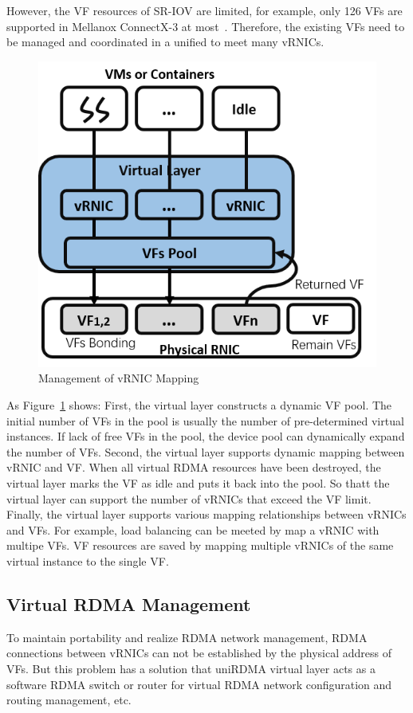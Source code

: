 However, the VF resources of SR-IOV are limited, for example, only 126 VFs are supported in Mellanox ConnectX-3 at most~\cite{ofed-manual}. Therefore, the existing VFs need to be managed and coordinated in a unified to meet many vRNICs.

\begin{figure}[!ht]
	\centering
	\includegraphics[width=1.0\linewidth]{images/vf-mapping}
	\caption{Management of vRNIC Mapping}
	\label{fig:vf-mapping}
\end{figure}

As Figure~\ref{fig:vf-mapping} shows: First, the virtual layer constructs a dynamic VF pool. The initial number of VFs in the pool is usually the number of pre-determined virtual instances. If lack of free VFs in the pool, the device pool can dynamically expand the number of VFs. Second, the virtual layer supports dynamic mapping between vRNIC and VF. When all virtual RDMA resources have been destroyed, the virtual layer marks the VF as idle and puts it back into the pool. So thatt the virtual layer can support the number of vRNICs that exceed the VF limit. Finally, the virtual layer supports various mapping relationships between vRNICs and VFs. For example, load balancing can be meeted by map a vRNIC with multipe VFs. VF resources are saved by mapping multiple vRNICs of the same virtual instance to the single VF. 

\subsection{Virtual RDMA Management}
To maintain portability and realize RDMA network management, RDMA connections between vRNICs can not be established by the physical address of VFs. But this problem has a solution that uniRDMA virtual layer acts as a software RDMA switch or router for virtual RDMA network configuration and routing management, etc.

